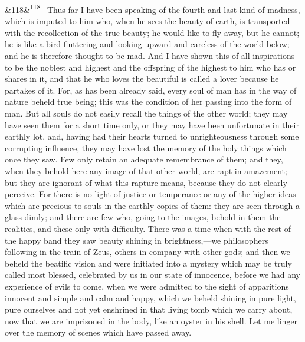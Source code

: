 \documentclass[12pt]{article}
\newcommand{\para}[1][]{\par\noindent\ifx&#1&\else\textsuperscript{\footnotesize #1}~\fi}
\begin{document}
\para[118] Thus far I have been speaking of the fourth and last kind of madness, which is imputed to him who, when he sees the beauty of earth, is transported with the recollection of the true beauty; he would like to fly away, but he cannot; he is like a bird fluttering and looking upward and careless of the world below; and he is therefore thought to be mad. And I have shown this of all inspirations to be the noblest and highest and the offspring of the highest to him who has or shares in it, and that he who loves the beautiful is called a lover because he partakes of it. For, as has been already said, every soul of man has in the way of nature beheld true being; this was the condition of her passing into the form of man. But all souls do not easily recall the things of the other world; they may have seen them for a short time only, or they may have been unfortunate in their earthly lot, and, having had their hearts turned to unrighteousness through some corrupting influence, they may have lost the memory of the holy things which once they saw. Few only retain an adequate remembrance of them; and they, when they behold here any image of that other world, are rapt in amazement; but they are ignorant of what this rapture means, because they do not clearly perceive. For there is no light of justice or temperance or any of the higher ideas which are precious to souls in the earthly copies of them: they are seen through a glass dimly; and there are few who, going to the images, behold in them the realities, and these only with difficulty. There was a time when with the rest of the happy band they saw beauty shining in brightness,---we philosophers following in the train of Zeus, others in company with other gods; and then we beheld the beatific vision and were initiated into a mystery which may be truly called most blessed, celebrated by us in our state of innocence, before we had any experience of evils to come, when we were admitted to the sight of apparitions innocent and simple and calm and happy, which we beheld shining in pure light, pure ourselves and not yet enshrined in that living tomb which we carry about, now that we are imprisoned in the body, like an oyster in his shell. Let me linger over the memory of scenes which have passed away.
\end{document}
